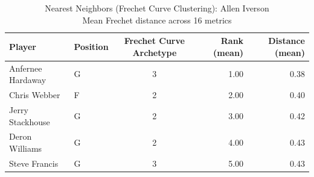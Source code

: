 \begin{table}[t]
\caption*{
{\fontsize{20}{25} Nearest Neighbors (Frechet Curve Clustering): Allen Iverson\fontsize{12}{15}\selectfont } \\ 
{\fontsize{14}{17}\selectfont  Mean Frechet distance across 16 metrics\fontsize{12}{15}\selectfont }
} 
\fontsize{12.0pt}{14.0pt}\selectfont
\begin{tabular*}{\linewidth}{@{\extracolsep{\fill}}llcrr}
\toprule
Player & Position & Frechet Curve Archetype & Rank (mean) & Distance (mean) \\ 
\midrule\addlinespace[2.5pt]
Anfernee Hardaway & G & 3 & 1.00 & 0.38 \\ 
Chris Webber & F & 2 & 2.00 & 0.40 \\ 
Jerry Stackhouse & G & 2 & 3.00 & 0.42 \\ 
Deron Williams & G & 2 & 4.00 & 0.43 \\ 
Steve Francis & G & 3 & 5.00 & 0.43 \\ 
\bottomrule
\end{tabular*}
\end{table}


